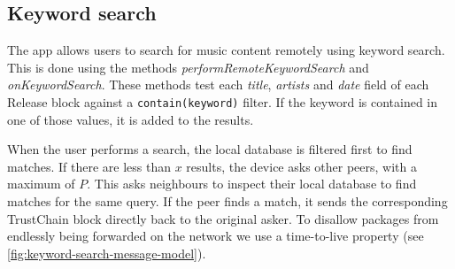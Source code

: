 
\subsection{Keyword search}
\label{sec:searching-musiccommunity-impl}
The app allows users to search for music content remotely using keyword search. This is done using the methods \textit{performRemoteKeywordSearch} and \textit{onKeywordSearch}. These methods test each \textit{title}, \textit{artists} and \textit{date} field of each Release block against a \verb|contain(keyword)| filter. If the keyword is contained in one of those values, it is added to the results.

When the user performs a search, the local database is filtered first to find matches. If there are less than \(x\) results, the device asks other peers, with a maximum of \(P\). This asks neighbours to inspect their local database to find matches for the same query. If the peer finds a match, it sends the corresponding TrustChain block directly back to the original asker. To disallow packages from endlessly being forwarded on the network we use a time-to-live property (see \ref{fig:keyword-search-message-model}).

